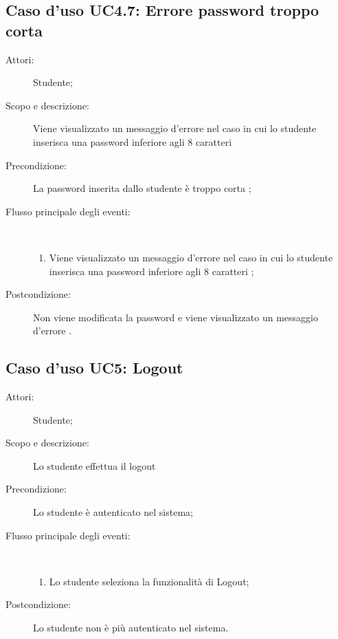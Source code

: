 \subsection{Caso d'uso UC4.7: Errore password troppo corta}\begin{description}
\item[Attori:] Studente;
\item[Scopo e descrizione:] Viene visualizzato un messaggio d'errore nel caso in cui lo studente inserisca una password inferiore agli 8 caratteri

      \item[Precondizione:] La password inserita dallo studente è troppo corta
;

        \item[Flusso principale degli eventi:] \ 
 \begin{enumerate}
          \item Viene visualizzato un messaggio d'errore nel caso in cui lo studente inserisca una password inferiore agli 8 caratteri	;

      \end{enumerate}
    \item[Postcondizione:] Non viene modificata la password e viene visualizzato un messaggio d'errore
.
  \end{description}
\hypertarget{UC5}{}
\subsection{Caso d'uso UC5: Logout}\begin{description}
\item[Attori:] Studente;
\item[Scopo e descrizione:] Lo studente effettua il logout
      \item[Precondizione:] Lo studente è autenticato nel sistema;

        \item[Flusso principale degli eventi:] \ 
 \begin{enumerate}
          \item Lo studente seleziona la funzionalità di Logout;

      \end{enumerate}
    \item[Postcondizione:] Lo studente non è più autenticato nel sistema.
  \end{description}
\hypertarget{UC6}{}
